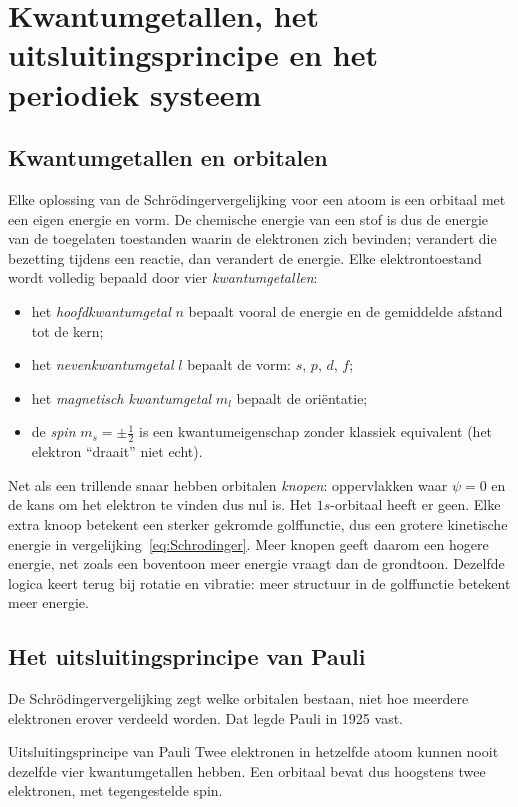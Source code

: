\section{Kwantumgetallen, het uitsluitingsprincipe en het periodiek systeem}

\subsection{Kwantumgetallen en orbitalen}

Elke oplossing van de Schr\"odingervergelijking voor een atoom is een orbitaal met een eigen energie en vorm. De chemische energie van een stof is dus de energie van de toegelaten toestanden waarin de elektronen zich bevinden; verandert die bezetting tijdens een reactie, dan verandert de energie. Elke elektrontoestand wordt volledig bepaald door vier \emph{kwantumgetallen}:
\begin{itemize}
\item het \emph{hoofdkwantumgetal} $n$ bepaalt vooral de energie en de gemiddelde afstand tot de kern;
\item het \emph{nevenkwantumgetal} $l$ bepaalt de vorm: $s$, $p$, $d$, $f$;
\item het \emph{magnetisch kwantumgetal} $m_l$ bepaalt de oriëntatie;
\item de \emph{spin} $m_s = \pm\tfrac{1}{2}$ is een kwantumeigenschap zonder klassiek equivalent (het elektron ``draait'' niet echt).
\end{itemize}

Net als een trillende snaar hebben orbitalen \emph{knopen}: oppervlakken waar $\psi = 0$ en de kans om het elektron te vinden dus nul is. Het $1s$-orbitaal heeft er geen. Elke extra knoop betekent een sterker gekromde golffunctie, dus een grotere kinetische energie in vergelijking~\eqref{eq:Schrodinger}. Meer knopen geeft daarom een hogere energie, net zoals een boventoon meer energie vraagt dan de grondtoon. Dezelfde logica keert terug bij rotatie en vibratie: meer structuur in de golffunctie betekent meer energie.

\subsection{Het uitsluitingsprincipe van Pauli}

De Schr\"odingervergelijking zegt welke orbitalen bestaan, niet hoe meerdere elektronen erover verdeeld worden. Dat legde Pauli in 1925 vast.

\begin{definitie}{Uitsluitingsprincipe van Pauli}
Twee elektronen in hetzelfde atoom kunnen nooit dezelfde vier kwantumgetallen hebben. Een orbitaal bevat dus hoogstens twee elektronen, met tegengestelde spin.
\end{definitie}

